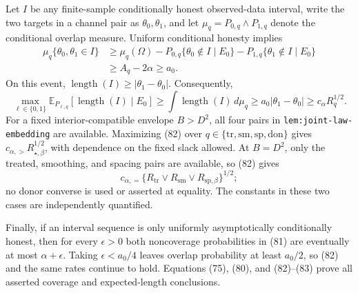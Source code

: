 Let \(I\) be any finite-sample conditionally honest observed-data interval,
write the two targets in a channel pair as \(\theta_0,\theta_1\), and let
\(\mu_q=P_{0,q}\wedge P_{1,q}\) denote the conditional overlap measure.
Uniform conditional honesty implies
\[
\begin{aligned}
\mu_q\{\theta_0,\theta_1\in I\}
&\ge \mu_q(\Omega)
-P_{0,q}\{\theta_0\notin I\mid E_0\}
-P_{1,q}\{\theta_1\notin I\mid E_0\}\\
&\ge A_q-2\alpha\ge a_0.
\end{aligned}
\tag{81}
\]
On this event, \(\operatorname{length}(I)\ge|\theta_1-\theta_0|\).
Consequently,
\[
\max_{\ell\in\{0,1\}}
\mathbb E_{P_{\ell,q}}[\operatorname{length}(I)\mid E_0]
\ge \int\operatorname{length}(I)\,d\mu_q
\ge a_0|\theta_1-\theta_0|
\ge c_\alpha R_q^{1/2}.
\tag{82}
\]
For a fixed interior-compatible envelope \(B>D^2\), all four pairs in
\texttt{lem:joint-law-embedding} are available.  Maximizing (82) over
\(q\in\{\mathrm{tr},\mathrm{sm},\mathrm{sp},\mathrm{don}\}\) gives
\(c_{\alpha,>}R_{\star,\beta}^{1/2}\), with dependence on the fixed slack
allowed.  At \(B=D^2\), only the treated, smoothing, and spacing pairs are
available, so (82) gives
\[
c_{\alpha,=}
\{R_{\mathrm{tr}}\vee R_{\mathrm{sm}}\vee
R_{\mathrm{sp},\beta}\}^{1/2};
\tag{83}
\]
no donor converse is used or asserted at equality.  The constants in these
two cases are independently quantified.

Finally, if an interval sequence is only uniformly asymptotically
conditionally honest, then for every \(\epsilon>0\) both noncoverage
probabilities in (81) are eventually at most \(\alpha+\epsilon\).  Taking
\(\epsilon<a_0/4\) leaves overlap probability at least \(a_0/2\), so (82)
and the same rates continue to hold.  Equations (75), (80), and (82)--(83)
prove all asserted coverage and expected-length conclusions.

